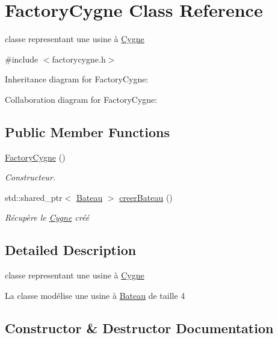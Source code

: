 \hypertarget{class_factory_cygne}{}\section{Factory\+Cygne Class Reference}
\label{class_factory_cygne}


classe representant une usine à \hyperlink{class_cygne}{Cygne}  




{\ttfamily \#include $<$factorycygne.\+h$>$}



Inheritance diagram for Factory\+Cygne\+:


Collaboration diagram for Factory\+Cygne\+:
\subsection*{Public Member Functions}
\begin{DoxyCompactItemize}
\item 
\hyperlink{class_factory_cygne_a976f5ce581e2beb4efd0a1662f2dd377}{Factory\+Cygne} ()
\begin{DoxyCompactList}\small\item\em Constructeur. \end{DoxyCompactList}\item 
std\+::shared\+\_\+ptr$<$ \hyperlink{class_bateau}{Bateau} $>$ \hyperlink{class_factory_cygne_aa49b4a3704bcb68c0e31cebc3f5767b8}{creer\+Bateau} ()
\begin{DoxyCompactList}\small\item\em Récupère le \hyperlink{class_cygne}{Cygne} créé \end{DoxyCompactList}\end{DoxyCompactItemize}


\subsection{Detailed Description}
classe representant une usine à \hyperlink{class_cygne}{Cygne} 

La classe modélise une usine à \hyperlink{class_bateau}{Bateau} de taille 4 

\subsection{Constructor \& Destructor Documentation}

